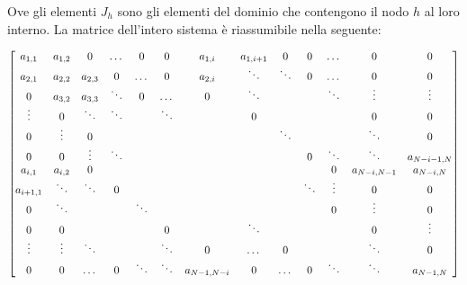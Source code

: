 \documentclass{tufte-handout}
\begin{document}
Ove gli elementi $J_h$ sono gli elementi del dominio che contengono il nodo $h$ al loro interno. La matrice dell'intero sistema è riassumibile nella seguente:
\begin{fullwidth}
    \[
        \setcounter{MaxMatrixCols}{20}
        \begin{bmatrix}
        
           a_{1,1}   & a_{1,2} & 0          & \dots  & 0      & 0 & a_{1,i} & a_{1,i+1} & 0 & 0 & \dots  & 0 & 0 \\
a_{2,1}   & a_{2,2} & a_{2,3} & 0      & \dots  & 0              & a_{2,i}     & \ddots       & \ddots & 0      & \dots  & 0            & 0              \\
0            & a_{3,2} & a_{3,3} & \ddots & 0      & \dots          & 0              & \ddots       &        &        & \ddots & \vdots       & \vdots         \\
\vdots       & 0          & \ddots     & \ddots &        & \ddots         &                & 0            &        &        &        & 0            & 0              \\
0            & \vdots     & 0          &        &        &                &                &              & \ddots &        &        & \ddots       & 0              \\
0            & 0          & \vdots     & \ddots &        &                &                &              &        & 0      & \ddots & \ddots       & a_{N-i-1,N} \\
a_{i,1}   & a_{i,2} & 0          &        &        &                &                &              &        &        & 0      & a_{N-i, N-1}            & a_{N-i,N}   \\
a_{i+1,1} & \ddots     & \ddots     & 0      &        &                &                &              &        & \ddots & \vdots & 0            & 0              \\
0            & \ddots     &            &        & \ddots &                &                &              &        &        & 0      & \vdots       & 0              \\
0       & 0          &            &        &        & 0              &                & \ddots       &        &        &        & 0            & \vdots         \\
\vdots       & \vdots     & \ddots     &        &        & \ddots         & 0              & \dots        & 0      &        &        & \ddots       & 0              \\
0            & 0          & \dots      & 0      & \ddots & \ddots         & a_{N-1,N-i} & 0            & \dots  & 0      & \ddots & \ddots       & a_{N-1,N}   \\

\end{bmatrix}\]
\end{fullwidth}
\end{document}
